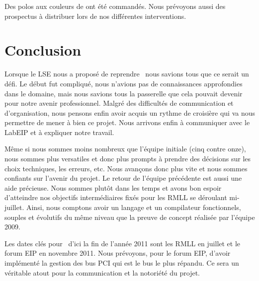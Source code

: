 \documentclass[francais]{rtxreport}
\begin{document}
Des polos aux couleurs de \rtx ont été commandés. Nous prévoyons aussi des
prospectus à distribuer lors de nos différentes interventions.

\chapter{Conclusion}


Lorsque le LSE nous a proposé de reprendre \rtx\ nous savions tous que ce
serait un défi. Le début fut compliqué, nous n’avions pas de connaissances
approfondies dans le domaine, mais nous savions tous la passerelle que cela
pouvait devenir pour notre avenir professionnel. Malgré des difficultés de
communication et d’organisation, nous pensons enfin avoir acquis un rythme de
croisière qui va nous permettre de mener à bien ce projet. Nous arrivons enfin
à communiquer avec le LabEIP et à expliquer notre travail.

Même si nous sommes moins nombreux que l’équipe initiale (cinq contre onze),
nous sommes plus versatiles et donc plus prompts à prendre des décisions sur les
choix techniques, les erreurs, etc. Nous avançons donc plus vite et nous sommes
confiants sur l’avenir du projet. Le retour de l'équipe précédente est aussi
une aide précieuse. Nous sommes plutôt dans les temps et avons bon espoir
d'atteindre nos objectifs intermédiaires fixés pour les RMLL se déroulant
mi-juillet. Ainsi, nous comptons avoir un langage et un compilateur
fonctionnels, souples et évolutifs du même niveau que la preuve de concept
réalisée par l'équipe 2009.

Les dates clés pour \rtx\ d'ici la fin de l'année 2011 sont les RMLL en juillet
et le forum EIP en novembre 2011. Nous prévoyons, pour le forum EIP, d'avoir
implémenté la gestion des bus PCI qui est le bus le plus répandu. Ce sera un
véritable atout pour la communication et la notoriété du projet.
\end{document}

